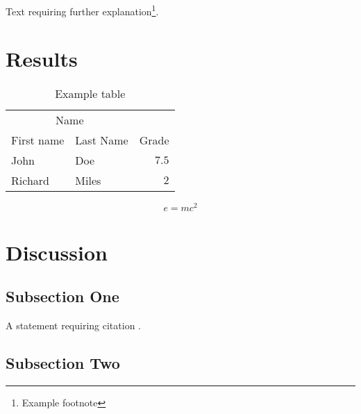 \documentclass[twoside,twocolumn]{article}
\begin{document}
Text requiring further explanation\footnote{Example footnote}.


\section{Results}

\begin{table}
\caption{Example table}
\centering
\begin{tabular}{llr}
\toprule
\multicolumn{2}{c}{Name} \\
\cmidrule(r){1-2}
First name & Last Name & Grade \\
\midrule
John & Doe & $7.5$ \\
Richard & Miles & $2$ \\
\bottomrule
\end{tabular}
\end{table}

\blindtext %

\begin{equation}
\label{eq:emc}
e = mc^2
\end{equation}

\blindtext %


\section{Discussion}

\subsection{Subsection One}

A statement requiring citation \cite{Figueredo2009}.
\blindtext %

\subsection{Subsection Two}

\blindtext %


  


\end{document}
